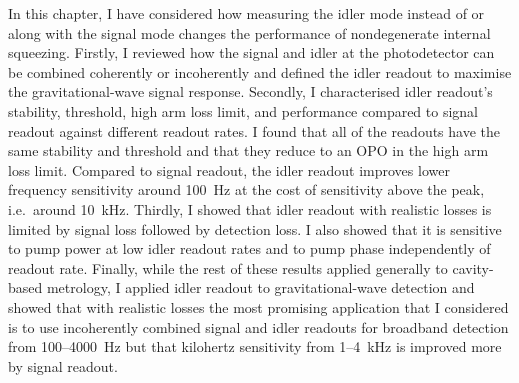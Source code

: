 In this chapter, I have considered how measuring the idler mode instead of or along with the signal mode changes the performance of nondegenerate internal squeezing. %
Firstly, I reviewed how the signal and idler at the photodetector can be combined coherently or incoherently and defined the idler readout to maximise the gravitational-wave signal response.
Secondly, I characterised idler readout's stability, threshold, high arm loss limit, and performance compared to signal readout against different readout rates. I found that all of the readouts have the same stability and threshold and that they reduce to an OPO in the high arm loss limit. Compared to signal readout, the idler readout improves lower frequency sensitivity around 100~Hz at the cost of sensitivity above the peak, i.e.\ around 10~kHz.
Thirdly, I showed that idler readout with realistic losses is limited by signal loss followed by detection loss. I also showed that it is sensitive to pump power at low idler readout rates and to pump phase independently of readout rate.
Finally, while the rest of these results applied generally to cavity-based metrology, I applied idler readout to gravitational-wave detection and showed that with realistic losses the most promising application that I considered is to use incoherently combined signal and idler readouts for broadband detection from 100--4000~Hz  but that kilohertz sensitivity from 1--4~kHz is improved more by signal readout. 



